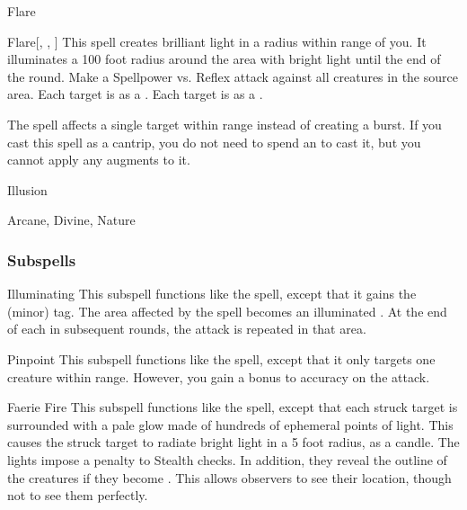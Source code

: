\newpage
\begin{spellsection}{Flare}


\begin{ability}{Flare}[, , ]
This spell creates brilliant light in a \areasmall radius within \rngmed range of you.
It illuminates a 100 foot radius around the area with bright light until the end of the round.
Make a Spellpower vs. Reflex attack against all creatures in the source area.
\hit Each target is \dazzled as a .
\crit Each target is \blinded as a .
\end{ability}



 The spell affects a single target within range instead of creating a burst. If you cast this spell as a cantrip,
you do not need to spend an  to cast it,
but you cannot apply any augments to it.


 Illusion

 Arcane, Divine, Nature
\end{spellsection}


\subsubsection{Subspells}


\begin{ability}[\nth{2}]{Illuminating}
This subspell functions like the  spell, except that it gains the  (minor) tag.
The area affected by the spell becomes an illuminated .
At the end of each  in subsequent rounds, the attack is repeated in that area.
\end{ability}
\vspace{0.25em}


\begin{ability}[\nth{2}]{Pinpoint}
This subspell functions like the  spell, except that it only targets one creature within \rngmed range.
However, you gain a  bonus to accuracy on the attack.
\end{ability}
\vspace{0.25em}


\begin{ability}[\nth{3}]{Faerie Fire}
This subspell functions like the  spell, except that each struck target is surrounded with a pale glow made of hundreds of ephemeral points of light.
This causes the struck target to radiate bright light in a 5 foot radius, as a candle.
The lights impose a  penalty to Stealth checks.
In addition, they reveal the outline of the creatures if they become .
This allows observers to see their location, though not to see them perfectly.
\end{ability}
\vspace{0.25em}



